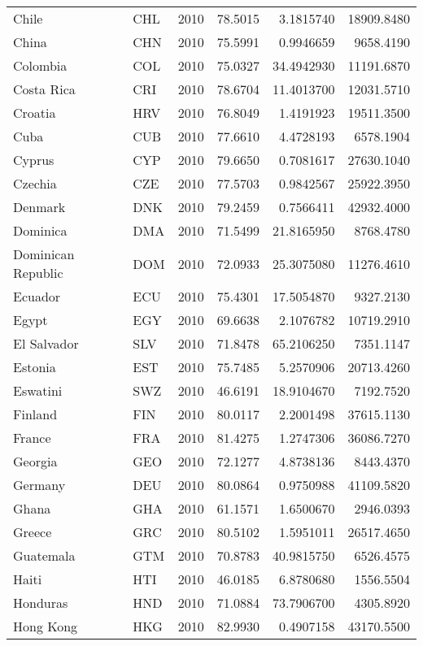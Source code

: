 \begin{longtable}[t]{llrrrr}
Chile & CHL & 2010 & 78.5015 & 3.1815740 & 18909.8480\\
\addlinespace
China & CHN & 2010 & 75.5991 & 0.9946659 & 9658.4190\\
Colombia & COL & 2010 & 75.0327 & 34.4942930 & 11191.6870\\
Costa Rica & CRI & 2010 & 78.6704 & 11.4013700 & 12031.5710\\
Croatia & HRV & 2010 & 76.8049 & 1.4191923 & 19511.3500\\
Cuba & CUB & 2010 & 77.6610 & 4.4728193 & 6578.1904\\
\addlinespace
Cyprus & CYP & 2010 & 79.6650 & 0.7081617 & 27630.1040\\
Czechia & CZE & 2010 & 77.5703 & 0.9842567 & 25922.3950\\
Denmark & DNK & 2010 & 79.2459 & 0.7566411 & 42932.4000\\
Dominica & DMA & 2010 & 71.5499 & 21.8165950 & 8768.4780\\
Dominican Republic & DOM & 2010 & 72.0933 & 25.3075080 & 11276.4610\\
\addlinespace
Ecuador & ECU & 2010 & 75.4301 & 17.5054870 & 9327.2130\\
Egypt & EGY & 2010 & 69.6638 & 2.1076782 & 10719.2910\\
El Salvador & SLV & 2010 & 71.8478 & 65.2106250 & 7351.1147\\
Estonia & EST & 2010 & 75.7485 & 5.2570906 & 20713.4260\\
Eswatini & SWZ & 2010 & 46.6191 & 18.9104670 & 7192.7520\\
\addlinespace
Finland & FIN & 2010 & 80.0117 & 2.2001498 & 37615.1130\\
France & FRA & 2010 & 81.4275 & 1.2747306 & 36086.7270\\
Georgia & GEO & 2010 & 72.1277 & 4.8738136 & 8443.4370\\
Germany & DEU & 2010 & 80.0864 & 0.9750988 & 41109.5820\\
Ghana & GHA & 2010 & 61.1571 & 1.6500670 & 2946.0393\\
\addlinespace
Greece & GRC & 2010 & 80.5102 & 1.5951011 & 26517.4650\\
Guatemala & GTM & 2010 & 70.8783 & 40.9815750 & 6526.4575\\
Haiti & HTI & 2010 & 46.0185 & 6.8780680 & 1556.5504\\
Honduras & HND & 2010 & 71.0884 & 73.7906700 & 4305.8920\\
Hong Kong & HKG & 2010 & 82.9930 & 0.4907158 & 43170.5500\\

\end{longtable}
